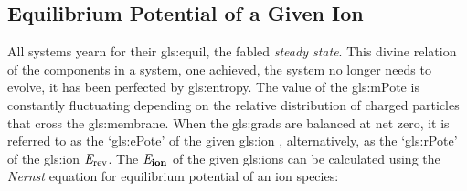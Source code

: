 \documentclass[class={myRUCProject}, crop=false]{standalone}
\begin{document}
\subsection{Equilibrium Potential of a Given Ion}
\begingroup
\allowdisplaybreaks
All systems yearn for their \gls{gls:equil}, the fabled \textit{steady state}. This divine relation of the components in a system, one achieved, the system no longer needs to evolve, it has been perfected by \gls{gls:entropy}.
The value of the \gls{gls:mPote} is constantly fluctuating depending on the relative distribution of charged particles that cross the \gls{gls:membrane}.
When the \glspl{gls:grad} are balanced at net zero, it is referred to as the `\gls{gls:ePote}' of the given \gls{gls:ion} \br{\equi\ion}, alternatively, as the `\gls{gls:rPote}' of the \gls{gls:ion} \(\mathit{E}_\mathrm{rev}\). 
The \(\mathit{E}_\mathbf{ion}\) of the given \glspl{gls:ion} can be calculated using the \emph{Nernst} equation for equilibrium potential of an ion species:
\end{document}
